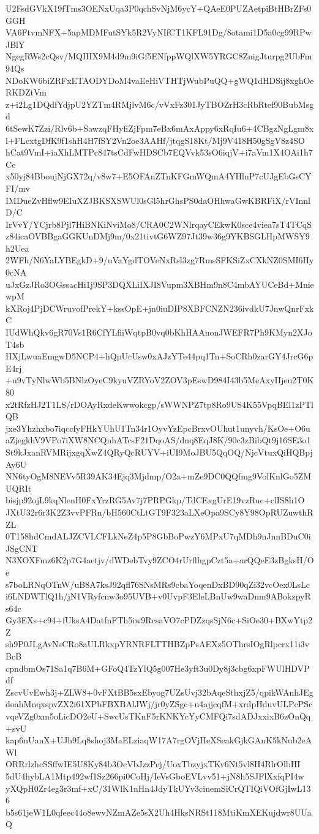 U2FsdGVkX19fTms3OENxUqa3P0qchSvNjM6ycY+QAeE0PUZAetpiBtHBrZFs0GGH
VA6FtvmNFX+5apMDMFutSYk5R2VyNIfCT1KFL91Dg/8otami1D5a0cg99RPwJBlY
NgegRWs2cQsv/MQIHX9M4d9m9iGf5ENfppWQlXW5YRGC8ZnigJturpg2UbFm94Qs
NDoKW6biZRFxETAODYDoM4vaEeHiVTHTjWubPuQQ+gWQ1dHDSij8xghOeRKDZtVm
z+i2Lg1DQdfYdjpU2YZTm4RMjlvM6c/vVxFz301JyTBOZrH3cRbRtef90BubMsgd
6tSewK7Zzi/Rlv6b+SawzqFHyfiZjFpm7eBx6mAxAppy6xRqIu6+4CBgzNgLgm8x
l+FLcxtgDfK9f1shH4H7fSY2Vn2oe3AAHf/jtqgS18Kt/Mj9V418H50gSgV8z4SO
hCat9VmI+iaXhLMTPc847tsCdFwHDSCb7EQVvk53sO6iqjV+i7aVm1X4OAi1h7Cc
x50yj84BboujNjGX72q/v8w7+E5OFAnZTnKFGmWQmA4YHlnP7cUJgEbGsCYFI/mv
IMDueZvHflw9EIuXZJBKSXSWUl0sGl5hrGhsPS0daOHhwaGwKBRFiX/rVInnlD/C
IrVvY/YCjrb8Pjl7HiBNKiNviMo8/CRA0C2WNlrqayCEkwK0sce4viea7sT4TCqS
z84icaOVBBgaGGKUnDMj9m/0x21tivtG6WZ97Jt39w36g9YKBSGLHpMWSY9h2Uea
2WFh/N6YaLYBEgkD+9/uVaYgdTOVeNxRsl3zg7RmsSFKSiZxCXkNZ0SMI6Hy0cNA
uJxGzJRo3OGssacHi1j9SP3DQXLiIXJI8Vupm3XBHm9n8C4mbAYUCeBd+MniewpM
kXRoj4PjDCWruvofPrekY+kssOpE+jn0iuDIP8XBFCNZN236ivdkU7JnwQnrFxkC
IUdWhQkv6gR70Vs1R6CfYLfiiWqtpB0vq0bKhHAAnonJWEFR7Ph9KMyn2XJoT4sb
HXjLwuaEmgwD5NCP4+hQpUcUsw0xAJzYTe44pq1Tn+SoCRh0zarGY4JrcG6pE4rj
+u9vTyNlwWb5BNlzOyeC9kyuVZRYoV2ZOV3pEswD984I43b5MeAxyIIjeu2T0K80
x2tRfzHJ2T1LS/rDOAyRxdeKwwokcgp/sWWNPZ7tp8Ro9US4K55VpqBEl1zPTlQB
jxe3Yhzhxbo7iqccfyFHkYUhU1Tn34r1OyvYzEpcBrxvOUhut1unyvh/KsOe+O6u
aZjegkhV9VPo7iXW8NCQnhATcsF21DqoAS/dnq8EqJ8K/90c3zBibQt9j16SE3o1
St9kJxanRVMRijxgqXwZ4QRyQcRUYV+iUI9MoJBU5QqOQ/NjcVtuxQiHQBpjAy6U
NN6tyOgM8NEVv5R39AK34Ejq3Mjdmp/O2a+mZe9DC0QQfmg9VolKnlGo5ZMUQRIt
bisjp92ojL9kqNlenH0FxYrzRG5Av7j7PRPGkp/TdCExgUrE19vzRuc+clIS8h1O
JXtU32r6r3K2Z3vvPFRn/bH560CtLtGT9F323aLXeOpa9SCy8Y98OpRUZuwthRZL
0T158hdCmdALJZCVLCFLkNeZ4p5P8GbBoPwzY6MPxU7qMDh9nJnnBDuC0iJSgCNT
N3XOXFmz6K2p7G4aetjv/dWDebTvy9ZCO4rUrflhgpCzt5a+arQQeE3zBgksH/Oe
s7boLRNqOTnW/uB8A7ksJ92qfl76SNsMRs9cbaYoqenDxBD90qZi32vcOex0LsLc
i6LNDWTlQ1h/jN1VRyfcnw3o95UVB+v0UvpF3EleLBnUw9waDnm9ABokzpyRs64c
Gy3EXs+c94+fUksA4DatfnFTh5iw9RcsaVO7cPDZzqsSjN6c+SiOe30+BXwYtp2Z
sh9P0JLgAvNsCRo8aULRkxpYRNRFLTTHBZpPsAEXz5OThrsIOgRlpcrx11i3vBcB
cpndbmOs71Sa1q7B6M+GFoQ4TzYlQ5g007He3yft3u0Dy8j3cbg6xpFWUlHDVPdf
ZscvUvEwh3j+ZLW8+0vFXtBB5sxEbyog7UZsUvj32bAqeSthxjZ5/qpikWAnhJEg
doahMnqxspvZX2i61XPbFBXBAlJWj/jr0yZSgc+u4ajjcqfM+xrdpHduvULPcPSc
vqeVZg0xm5oLicDO2eU+SwcUsTKnF5rKNKYcYyCMFQi7sdADJxxixB6zOnQq+svU
kap6nUanX+UJh9Lq8shoj3MaELziaqW17A7rgOVjHeXSeakGjkGAnK5kNub2eAWl
ORRrlzhcSSffwIE5U8Ky84b3OcVbJzzPej/UoxTbzyjxTKv6Nt5vl8H4RlrOlbHI
5dU4hybLA1Mtp492wf1Sz266pi0CoHj/IeVsGboEVLvv51+jN8h5SJFlXxfqPI4w
yXQpH0Zr4eg3r3mf+xC/31WlK1nHn4JdyTkUYv3cinemSiCrQTIQiVOfGjIwL136
b5s61jeW1L0qfeec44o8ewvNZmAZe5sX2Uh4HksNRSt118MtiKmXEKujdwr8UUaQ
